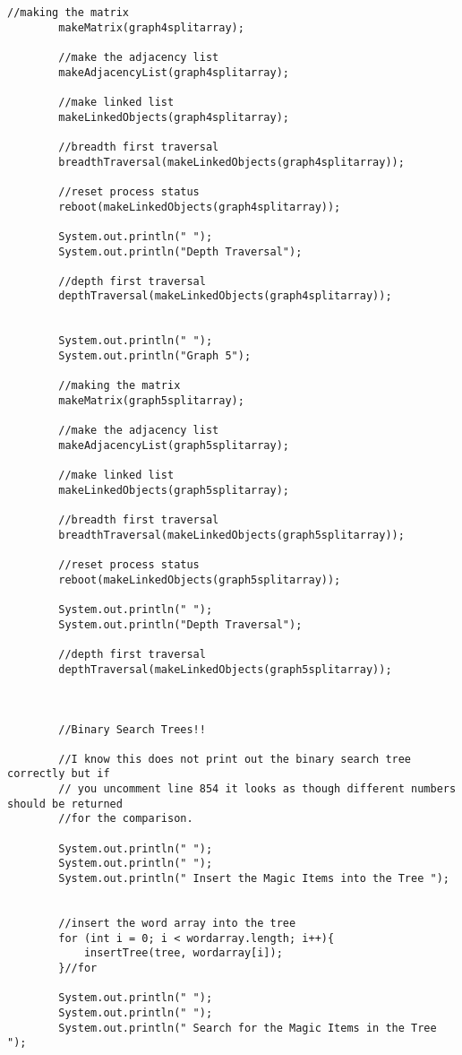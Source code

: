 \documentclass[letterpaper, 10pt,DIV=13]{scrartcl}
\numberwithin{equation}{section} %
\numberwithin{figure}{section} %
\numberwithin{table}{section} %
\begin{document}
\begin{lstlisting}[frame=single, ]
        //making the matrix
        makeMatrix(graph4splitarray);

        //make the adjacency list
        makeAdjacencyList(graph4splitarray);

        //make linked list
        makeLinkedObjects(graph4splitarray);

        //breadth first traversal
        breadthTraversal(makeLinkedObjects(graph4splitarray));

        //reset process status
        reboot(makeLinkedObjects(graph4splitarray));

        System.out.println(" ");
        System.out.println("Depth Traversal");

        //depth first traversal
        depthTraversal(makeLinkedObjects(graph4splitarray));


        System.out.println(" ");
        System.out.println("Graph 5");

        //making the matrix
        makeMatrix(graph5splitarray);

        //make the adjacency list
        makeAdjacencyList(graph5splitarray);

        //make linked list
        makeLinkedObjects(graph5splitarray);

        //breadth first traversal
        breadthTraversal(makeLinkedObjects(graph5splitarray));

        //reset process status
        reboot(makeLinkedObjects(graph5splitarray));

        System.out.println(" ");
        System.out.println("Depth Traversal");

        //depth first traversal
        depthTraversal(makeLinkedObjects(graph5splitarray));



        //Binary Search Trees!!

        //I know this does not print out the binary search tree correctly but if
        // you uncomment line 854 it looks as though different numbers should be returned 
        //for the comparison.

        System.out.println(" ");
        System.out.println(" ");
        System.out.println(" Insert the Magic Items into the Tree ");

        
        //insert the word array into the tree
        for (int i = 0; i < wordarray.length; i++){
            insertTree(tree, wordarray[i]);
        }//for

        System.out.println(" ");
        System.out.println(" ");
        System.out.println(" Search for the Magic Items in the Tree ");


\end{lstlisting}
\end{document}
